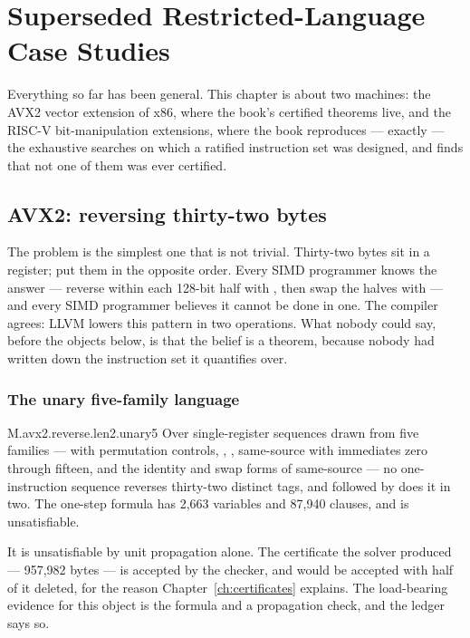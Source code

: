 \chapter{Superseded Restricted-Language Case Studies}
\label{ch:machines}

Everything so far has been general. This chapter is about two machines: the AVX2 vector extension of x86, where the book's certified theorems live, and the RISC-V bit-manipulation extensions, where the book reproduces --- exactly --- the exhaustive searches on which a ratified instruction set was designed, and finds that not one of them was ever certified.

\section{AVX2: reversing thirty-two bytes}
\label{sec:avx2}

The problem is the simplest one that is not trivial. Thirty-two bytes sit in a register; put them in the opposite order. Every SIMD programmer knows the answer --- reverse within each 128-bit half with , then swap the halves with  --- and every SIMD programmer believes it cannot be done in one. The compiler agrees: LLVM lowers this pattern in two operations. What nobody could say, before the objects below, is that the belief is a theorem, because nobody had written down the instruction set it quantifies over.

\subsection{The unary five-family language}

\begin{artifact}{M.avx2.reverse.len2.unary5}
Over single-register sequences drawn from five families ---  with permutation controls, , , same-source  with immediates zero through fifteen, and the identity and swap forms of same-source  --- no one-instruction sequence reverses thirty-two distinct tags, and  followed by  does it in two. The one-step formula has 2,663 variables and 87,940 clauses, and is unsatisfiable.

It is unsatisfiable by unit propagation alone. The certificate the solver produced --- 957,982 bytes --- is accepted by the checker, and would be accepted with half of it deleted, for the reason Chapter~\ref{ch:certificates} explains. The load-bearing evidence for this object is the formula and a propagation check, and the ledger says so.
\end{artifact}

